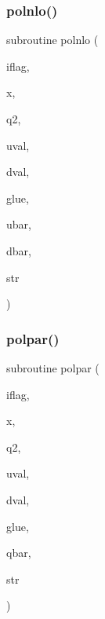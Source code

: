 \mbox{\label{polpdf_8f_ae26fa03871621906a70975a835a4ee85}} 
\subsubsection{\texorpdfstring{polnlo()}{polnlo()}}
{\footnotesize\ttfamily subroutine polnlo (\begin{DoxyParamCaption}\item[{}]{iflag,  }\item[{}]{x,  }\item[{}]{q2,  }\item[{}]{uval,  }\item[{}]{dval,  }\item[{}]{glue,  }\item[{}]{ubar,  }\item[{}]{dbar,  }\item[{}]{str }\end{DoxyParamCaption})}

\mbox{\label{polpdf_8f_a3e3afd88ba8363455b22fd4fb5727df6}} 
\subsubsection{\texorpdfstring{polpar()}{polpar()}}
{\footnotesize\ttfamily subroutine polpar (\begin{DoxyParamCaption}\item[{}]{iflag,  }\item[{}]{x,  }\item[{}]{q2,  }\item[{}]{uval,  }\item[{}]{dval,  }\item[{}]{glue,  }\item[{}]{qbar,  }\item[{}]{str }\end{DoxyParamCaption})}

\mbox{\label{polpdf_8f_a2fb724c2930167235703c922c529999c}} 

